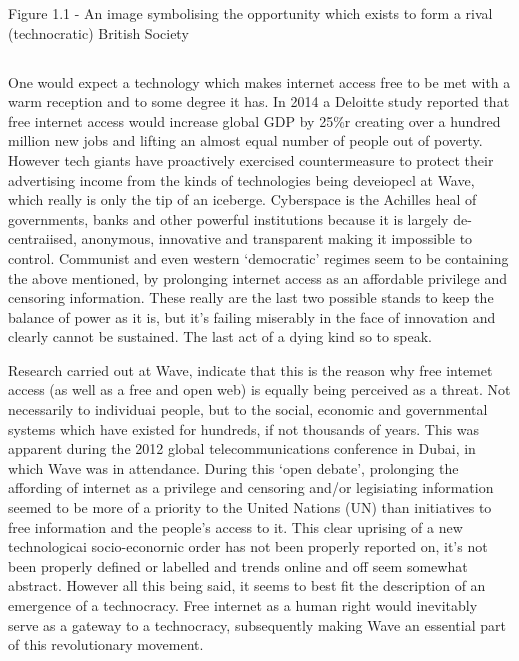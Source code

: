 \documentclass[letterpaper,10pt,openany,oneside,english]{sphinxmanual}
\begin{document}
Figure 1.1 - An image symbolising the opportunity which exists to form a rival (technocratic) British Society

\noindent{}


\subsection{}
\label{\detokenize{overview:united-technocracy-of-extropy-ute}}
One would expect a technology which makes internet access free to be met with a warm reception and to some degree it has.
In 2014 a Deloitte study reported that free internet access would increase global GDP by 25\%r creating over a hundred million new jobs and lifting an almost equal number of people out of poverty. However tech giants have proactively exercised countermeasure to protect their advertising income from the kinds of technologies being deveiopecl at Wave, which really is only the tip of an iceberge. Cyberspace is the Achilles heal of governments, banks and other powerful institutions because it is largely de-centraiised, anonymous, innovative and transparent making it impossible to control. Communist and even western ‘democratic’ regimes seem to be containing the above mentioned, by prolonging internet access as an affordable privilege and censoring information.  These really are the last two possible stands to keep the balance of power as it is, but it’s failing miserably in the face of innovation and clearly cannot be sustained. The last act of a dying kind so to speak.

Research carried out at Wave, indicate that this is the reason why free intemet access (as well as a free and open web) is equally being perceived as a threat. Not necessarily to individuai people, but to the social, economic and governmental systems which have existed for hundreds, if not thousands of years.
This was apparent during the 2012 global telecommunications conference in Dubai, in which Wave was in attendance. During this ‘open debate’, prolonging the affording of internet as a privilege and censoring and/or legisiating information seemed to be more of a priority to the United Nations (UN) than initiatives to free information and the people’s access to it. This clear uprising of a new technologicai socio-econornic order has not been properly reported on, it’s not been properly defined or labelled and trends online and off seem somewhat abstract. However all this being said, it seems to best fit the description of an emergence of a technocracy. Free internet as a human right would inevitably serve as a gateway to a technocracy, subsequently making Wave an essential part of this revolutionary movement.
\end{document}
